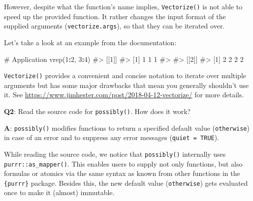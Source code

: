 \documentclass[
]{krantz}
\makeatletter
\newenvironment{Shaded}{\begin{snugshade}}{\end{snugshade}}
\newcommand{\CommentTok}[1]{\textcolor[rgb]{0.56,0.35,0.01}{\textit{#1}}}
\newcommand{\DecValTok}[1]{\textcolor[rgb]{0.00,0.00,0.81}{#1}}
\newcommand{\KeywordTok}[1]{\textcolor[rgb]{0.13,0.29,0.53}{\textbf{#1}}}
\newcommand{\NormalTok}[1]{#1}
\newcommand{\OperatorTok}[1]{\textcolor[rgb]{0.81,0.36,0.00}{\textbf{#1}}}
\newcommand{\StringTok}[1]{\textcolor[rgb]{0.31,0.60,0.02}{#1}}
\newenvironment{kframe}{%
\medskip{}
\setlength{\fboxsep}{.8em}
 \def\at@end@of@kframe{}%
 \ifinner\ifhmode%
  \def\at@end@of@kframe{\end{minipage}}%
  \begin{minipage}{\columnwidth}%
 \fi\fi%
 \def\FrameCommand##1{\hskip\@totalleftmargin \hskip-\fboxsep
 \colorbox{shadecolor}{##1}\hskip-\fboxsep
     \hskip-\linewidth \hskip-\@totalleftmargin \hskip\columnwidth}%
 \MakeFramed {\advance\hsize-\width
   \@totalleftmargin\z@ \linewidth\hsize
   \@setminipage}}%
 {\par\unskip\endMakeFramed%
 \at@end@of@kframe}
\renewenvironment{Shaded}{\begin{kframe}}{\end{kframe}}
\renewcommand{\KeywordTok} [1]{\textcolor[rgb]{0.00,0.44,0.13}{{#1}}}
\renewcommand{\DecValTok}  [1]{\textcolor[rgb]{0.25,0.63,0.44}{{#1}}}
\renewcommand{\StringTok}  [1]{\textcolor[rgb]{0.25,0.44,0.63}{{#1}}}
\renewcommand{\CommentTok} [1]{\textcolor[rgb]{0.38,0.63,0.69}{{#1}}}
\renewcommand{\NormalTok}  [1]{{#1}}
\makeatother
\begin{document}
However, despite what the function's name implies, \texttt{Vectorize()} is not able to speed up the provided function. It rather changes the input format of the supplied arguments (\texttt{vectorize.args}), so that they can be iterated over.

Let's take a look at an example from the documentation:

\begin{Shaded}
\end{Shaded}

\begin{Shaded}
\begin{Highlighting}[]
\CommentTok{# Application}
\KeywordTok{vrep}\NormalTok{(}\DecValTok{1}\OperatorTok{:}\DecValTok{2}\NormalTok{, }\DecValTok{3}\OperatorTok{:}\DecValTok{4}\NormalTok{)}
\CommentTok{#> [[1]]}
\CommentTok{#> [1] 1 1 1}
\CommentTok{#> }
\CommentTok{#> [[2]]}
\CommentTok{#> [1] 2 2 2 2}
\end{Highlighting}
\end{Shaded}

\texttt{Vectorize()} provides a convenient and concise notation to iterate over multiple arguments but has some major drawbacks that mean you generally shouldn't use it. See \url{https://www.jimhester.com/post/2018-04-12-vectorize/} for more details.

\textbf{{Q2}}: Read the source code for \texttt{possibly()}. How does it work?

\textbf{{A}}: \texttt{possibly()} modifies functions to return a specified default value (\texttt{otherwise}) in case of an error and to suppress any error messages (\texttt{quiet\ =\ TRUE}).

While reading the source code, we notice that \texttt{possibly()} internally uses \texttt{purrr::as\_mapper()}. This enables users to supply not only functions, but also formulas or atomics via the same syntax as known from other functions in the \texttt{\{purrr\}} package. Besides this, the new default value (\texttt{otherwise}) gets evaluated once to make it (almost) immutable.
\end{document}
